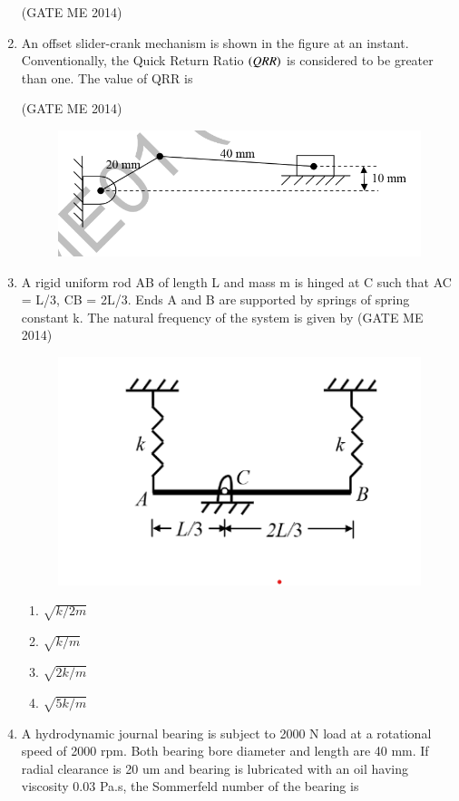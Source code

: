 \documentclass[journal]{IEEEtran}
\numberwithin{equation}{enumi}
\numberwithin{figure}{enumi}
\begin{document}
\begin{enumerate}
 \hfill{(GATE ME 2014)}

\item An offset slider-crank mechanism is shown in the figure at an instant. Conventionally, the Quick
Return Ratio $\left(QRR\right)$ is considered to be greater than one. The value of QRR is


 \hfill{(GATE ME 2014)}
 
\begin{figure}[H]
    \centering
    \includegraphics[width = 0.6\columnwidth]{figs/fig2.5.png}
    \caption*{}
    \label{fig:Q37}
\end{figure}

\item A rigid uniform rod AB of length L and mass m is hinged at C such that AC = L/3, CB = 2L/3. Ends
A and B are supported by springs of spring constant k. The natural frequency of the system is given
by
 \hfill{(GATE ME 2014)}
 
\begin{figure}[H]
    \centering
    \includegraphics[width = 0.6\columnwidth]{figs/fig2.6.png}
    \caption*{}
    \label{fig:Q38}
\end{figure}
\begin{multicols}{4}
    \begin{enumerate}
        \item $\sqrt{k/2m}$
         \item $\sqrt{k/m}$
         \item $\sqrt{2k/m}$
         \item $\sqrt{5k/m}$
    \end{enumerate}
\end{multicols}

\item A hydrodynamic journal bearing is subject to 2000 N load at a rotational speed of 2000 rpm. Both
bearing bore diameter and length are 40 mm. If radial clearance is 20 um and bearing is lubricated
with an oil having viscosity 0.03 Pa.s, the Sommerfeld number of the bearing is


\end{enumerate}
\end{document}

